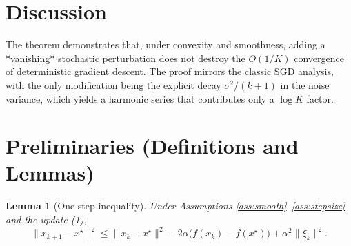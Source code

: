 \documentclass{article}
\newtheorem{lemma}{Lemma}
\begin{document}
\section*{Discussion}
The theorem demonstrates that, under convexity and smoothness, adding a *vanishing* stochastic perturbation does not destroy the $O(1/K)$ convergence of deterministic gradient descent.  The proof mirrors the classic SGD analysis, with the only modification being the explicit decay $\sigma^{2}/(k+1)$ in the noise variance, which yields a harmonic series that contributes only a $\log K$ factor.

\newpage

\section*{Preliminaries (Definitions and Lemmas)}
\begin{lemma}[One‑step inequality]\label{lem:one_step}
Under Assumptions \ref{ass:smooth}–\ref{ass:stepsize} and the update (1),
\[
\|x_{k+1}-x^{\star}\|^{2}
\le
\|x_{k}-x^{\star}\|^{2}
-2\alpha\bigl(f(x_{k})-f(x^{\star})\bigr)
+\alpha^{2}\|\xi_{k}\|^{2}.
\tag{4}
\]
\end{lemma}
\end{document}
